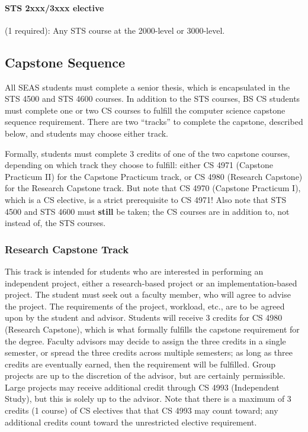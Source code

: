 \paragraph{STS 2xxx/3xxx elective} (1 required): Any STS course at the
  2000-level or 3000-level.
 
\subsection{Capstone Sequence}
\label{capstone-section}

All SEAS students must complete a senior thesis, which is encapsulated
in the STS 4500 and STS 4600 courses.  In addition to the STS courses,
BS CS students must complete one or two CS courses to fulfill the
computer science capstone sequence requirement.  There are two
``tracks'' to complete the capstone, described below, and students may
choose either track.

Formally, students must complete 3 credits of one of the two capstone
courses, depending on which track they choose to
fulfill: either CS 4971 (Capstone Practicum II) for the Capstone
Practicum track, or CS 4980 (Research Capstone) for the Research
Capstone track.  But note that CS 4970 (Capstone Practicum I), which
is a CS elective, is a strict prerequisite to CS 4971!  Also note
that STS 4500 and STS 4600 must {\bf still} be taken; the CS courses
are in addition to, not instead of, the STS courses.

\subsubsection{Research Capstone Track}

This track is intended for students who are interested in performing
an independent project, either a research-based project or an
implementation-based project.  The student must seek out a faculty
member, who will agree to advise the project.  The requirements of the
project, workload, etc., are to be agreed upon by the student and
advisor.  Students will receive 3 credits for CS 4980 (Research
Capstone), which is what formally fulfills the capstone requirement
for the degree.  Faculty advisors may decide to assign the three
credits in a single semester, or spread the three credits across
multiple semesters; as long as three credits are eventually earned,
then the requirement will be fulfilled.  Group projects are up to the
discretion of the advisor, but are certainly permissible.  Large
projects may receive additional credit through CS 4993 (Independent
Study), but this is solely up to the advisor.  Note that there is a
maximum of 3 credits (1 course) of CS electives that that CS 4993 may
count toward; any additional credits count toward the unrestricted
elective requirement.

